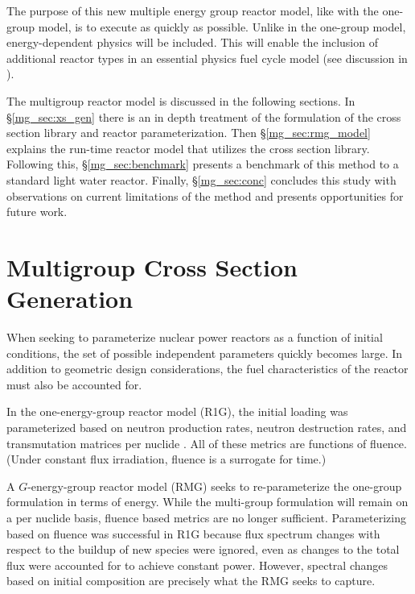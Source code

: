 The purpose of this new multiple energy group reactor model, like with the one-group model, is to 
execute as quickly as possible.  Unlike in the one-group model, energy-dependent physics will be included.  
This will enable the inclusion of additional reactor types in an essential physics fuel 
cycle model (see discussion in \cite{Scopatz2009}).

The multigroup reactor model is discussed in the following sections.  In \S \ref{mg_sec:xs_gen} 
there is an in depth treatment of the formulation of the cross section library and reactor 
parameterization.  Then \S \ref{mg_sec:rmg_model} explains the run-time reactor model that 
utilizes the cross section library.  Following this, \S \ref{mg_sec:benchmark} presents a 
benchmark of this method to a standard light water reactor.  Finally, \S \ref{mg_sec:conc}
concludes this study with observations on current limitations of the method and presents 
opportunities for future work.



\section{Multigroup Cross Section Generation}
\label{mg_sec:xs_gen}
When seeking to parameterize nuclear power reactors as a function of initial conditions, 
the set of possible independent parameters quickly becomes large. In addition to geometric 
design considerations, the fuel characteristics of the reactor must also be accounted for.

In the one-energy-group reactor model (R1G), the initial loading was parameterized based
on neutron production rates, neutron destruction rates, and transmutation matrices per
nuclide \cite{Scopatz2009}.  All of these metrics are functions of fluence.  (Under 
constant flux irradiation, fluence is a surrogate for time.)

A $G$-energy-group reactor model (RMG) seeks to re-parameterize the one-group formulation 
in terms of energy.  While the multi-group formulation will remain on a per nuclide basis, 
fluence based metrics are no longer sufficient.  Parameterizing based on fluence was successful in R1G because 
flux spectrum changes with respect to the buildup of new species were ignored, even as changes to the total 
flux were accounted for to achieve constant power.   However, 
spectral changes based on initial composition are precisely what the RMG seeks to capture.

